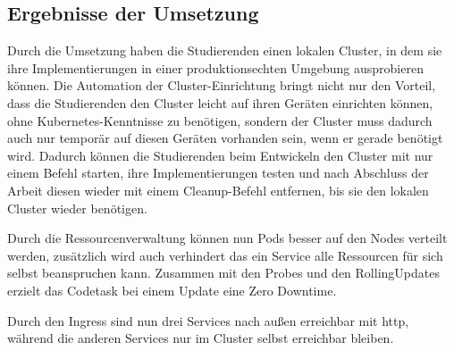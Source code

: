 \subsection{Ergebnisse der Umsetzung}
Durch die Umsetzung haben die Studierenden einen lokalen Cluster, in dem sie ihre Implementierungen in einer produktionsechten Umgebung ausprobieren können.
Die Automation der Cluster-Einrichtung bringt nicht nur den Vorteil, dass die Studierenden den Cluster leicht auf ihren Geräten einrichten können, ohne Kubernetes-Kenntnisse zu benötigen, sondern der Cluster muss dadurch auch nur temporär auf diesen Geräten vorhanden sein, wenn er gerade benötigt wird. 
Dadurch können die Studierenden beim Entwickeln den Cluster mit nur einem Befehl starten, ihre Implementierungen testen und nach Abschluss der Arbeit diesen wieder mit einem Cleanup-Befehl entfernen, bis sie den lokalen Cluster wieder benötigen.

Durch die Ressourcenverwaltung können nun Pods besser auf den Nodes verteilt werden, zusätzlich wird auch verhindert das ein Service alle Ressourcen für sich selbst beanspruchen kann.
Zusammen mit den Probes und den RollingUpdates erzielt das Codetask bei einem Update eine Zero Downtime.

Durch den Ingress sind nun drei Services nach außen erreichbar mit http, während die anderen Services nur im Cluster selbst erreichbar bleiben.